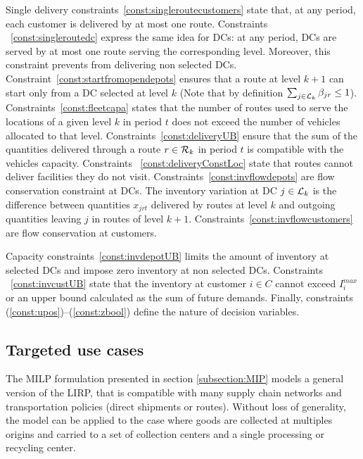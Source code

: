 \documentclass[a4paper,10pt]{article}
\begin{document}
\begin{linenumbers}
Single delivery constraints~\eqref{const:singleroutecustomers} state that, at any period, each customer is delivered by at most one route. 
%
Constraints ~\eqref{const:singleroutedc} express the same idea for DCs: at any period, DCs are served by at most one route serving the corresponding level. Moreover, this constraint prevents from delivering non selected DCs. 
%
Constraint~\eqref{const:startfromopendepots} ensures that a route at level $k+1$ can start only from a DC selected at level $k$ (Note that by definition $\sum_{j\in\mathcal{L}_{k}} \beta_{jr} \leq 1$).
%
Constraints~\eqref{const:fleetcapa} states that the number of routes used to serve the locations of a given level $k$ in period $t$ does not exceed the number of vehicles allocated to that level. 
%
Constraints~\eqref{const:deliveryUB} ensure that the sum of the quantities delivered through a route $r\in\mathcal{R}_k$ in period $t$ is compatible with the vehicles capacity. 
%
Constraints ~\eqref{const:deliveryConstLoc}  state that routes cannot deliver facilities they do not visit. 
%
Constraints~\eqref{const:invflowdepots} are flow conservation constraint at DCs. 
The inventory variation at DC $j \in \mathcal{L}_k$ is the difference between quantities $x_{jrt}$ delivered by routes at level $k$ and outgoing quantities leaving $j$ in routes of level $k+1$. 
%
Constraints~\eqref{const:invflowcustomers} are flow conservation at customers.

%
Capacity constraints~\eqref{const:invdepotUB} limits the amount of inventory at selected DCs and impose zero inventory at non selected DCs. 
%
Constraints ~\eqref{const:invcustUB} state that the inventory at customer $i \in C$ cannot exceed $I_i^{max}$ or an upper bound calculated as the sum of future demands. 
%
Finally, constraints (\ref{const:upos})--(\ref{const:zbool}) define the nature of decision variables. 




\subsection{Targeted use cases}

The MILP formulation presented in section \ref{subsection:MIP} models a general version of the LIRP, 
that is compatible with many supply chain networks and transportation policies (direct shipments or routes). 
Without loss of generality, the model can be applied to the case where goods are collected at multiples origins and carried to a set of collection centers and a single processing or recycling center. 


\end{linenumbers}
\end{document}
